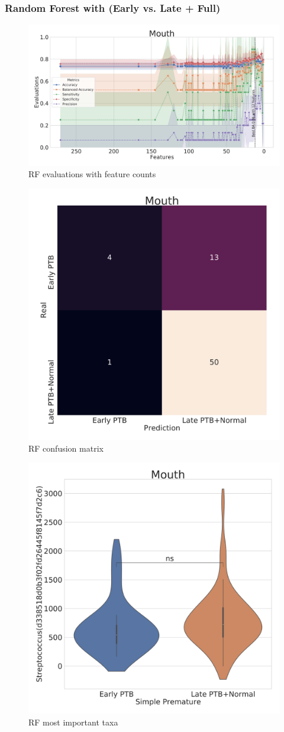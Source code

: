 \documentclass{beamer}
\begin{document}
    \begin{frame}[allowframebreaks]
        \frametitle{Random Forest with (Early vs. Late + Full)}

        \begin{figure}
            \includegraphics[width=0.8 \linewidth]{figures/RandomForest/RF-two.DADA2.homd/Mouth+metrics.pdf}
            \caption{RF evaluations with feature counts}
        \end{figure}

        \begin{figure}
            \includegraphics[width=0.5 \linewidth]{figures/RandomForest/RF-two.DADA2.homd/Mouth+heatmap.pdf}
            \caption{RF confusion matrix}
        \end{figure}

        \begin{figure}
            \includegraphics[width=0.5 \linewidth]{figures/RandomForest/RF-two.DADA2.homd/Mouth+Violin_0.pdf}
            \caption{RF most important taxa}
        \end{figure}
    \end{frame}
\end{document}
